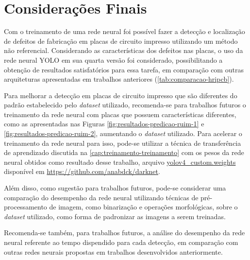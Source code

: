 \chapter{Considerações Finais}
Com o treinamento de uma rede neural foi possível fazer a detecção e localização de defeitos de fabricação em placas de circuito impresso utilizando um método não referencial. Considerando as características dos defeitos nas placas, o uso da rede neural YOLO em sua quarta versão foi considerado, possibilitando a obtenção de resultados satisfatórios para essa tarefa, em comparação com outras arquiteturas apresentadas em trabalhos anteriores (\autoref{tab:comparacao-hripcb}).

Para melhorar a detecção em placas de circuito impresso que são diferentes do padrão estabelecido pelo \textit{dataset} utilizado, recomenda-se para trabalhos futuros o treinamento da rede neural com placas que possuem características diferentes, como as apresentadas nas Figuras \ref{fig:resultados-predicao-ruim-1} e \ref{fig:resultados-predicao-ruim-2}, aumentando o \textit{dataset} utilizado.  Para acelerar o treinamento da rede neural para isso, pode-se utilizar a técnica de transferência de aprendizado discutida na \autoref{cap:treinamento-treinamento} com os pesos da rede neural obtidos como resultado desse trabalho, arquivo \url{yolov4_custom.weights} disponível em \url{https://github.com/anabdck/darknet}.

Além disso, como sugestão para trabalhos futuros, pode-se considerar uma comparação do desempenho da rede neural utilizando técnicas de pré-processamento de imagem, como binarização e operações morfológicas, sobre o \textit{dataset} utilizado, como forma de padronizar as imagens a serem treinadas.

Recomenda-se também, para trabalhos futuros, a análise do desempenho da rede neural referente ao tempo dispendido para cada detecção, em comparação com outras redes neurais propostas em trabalhos desenvolvidos anteriormente.
